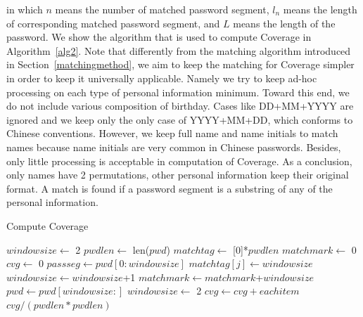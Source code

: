 \documentclass{sig-alternate}
\begin{document}
in which $n$ means the number of matched password segment, $l_n$ means the length of corresponding matched password segment, and $L$ means the length of the password. We show the algorithm that is used to compute Coverage in Algorithm~\ref{alg2}. Note that differently from the matching algorithm introduced in Section~\ref{matchingmethod}, we aim to keep the matching for Coverage simpler in order to keep it universally applicable. Namely we try to keep ad-hoc processing on each type of personal information minimum. Toward this end, we do not include various composition of birthday. Cases like DD+MM+YYYY are ignored and we keep only the only case of YYYY+MM+DD, which conforms to Chinese conventions. However, we keep full name and name initials to match names because name initials are very common in Chinese passwords. Besides, only little processing is acceptable in computation of Coverage. As a conclusion, only names have 2 permutations, other personal information keep their original format. A match is found if a password segment is a substring of any of the personal information.


\begin{algorithm}[!]
\caption{Compute Coverage}
\label{alg2}
\begin{algorithmic}[1]
\State $windowsize \gets$ 2
\State $pwdlen \gets$ len($pwd$)
\State $matchtag \gets$ [0]*$pwdlen$
\State $matchmark \gets $ 0
\State $cvg \gets $ 0
\State $passseg \gets pwd[0:windowsize]$
\State $matchtag[j] \gets windowsize$
\EndFor
{}
\State $windowsize \gets windowsize$+1
\EndIf
\Else
\State $matchmark \gets matchmark$+$windowsize$
\State $pwd \gets pwd[windowsize:]$
\State $windowsize \gets$ 2
\EndIf
\EndWhile
{}
\State $cvg \gets cvg + eachitem$
\EndFor
\State \Return $cvg/(pwdlen * pwdlen)$
\EndProcedure
\end{algorithmic}
\end{algorithm}
\end{document}
